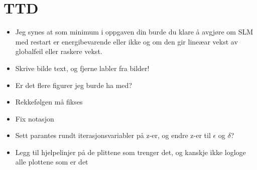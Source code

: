 \chapter{TTD}
\begin{itemize}
\item Jeg synes at som minimum i oppgaven din burde du klare å avgjøre om SLM med restart er energibevarende eller ikke og om den gir lineæar vekst av globalfeil eller raskere vekst.
\item Skrive bilde text, og fjerne labler fra bilder!
\item Er det flere figurer jeg burde ha med?
\item Rekkefølgen må fikses
\item Fix notasjon
\item Sett parantes rundt iterasjonsvariabler på z-er, og endre z-er til $\epsilon$ og $\delta$?
\item Legg til hjelpelinjer på de plittene som trenger det, og kanskje ikke logloge alle plottene som er det

\end{itemize}
